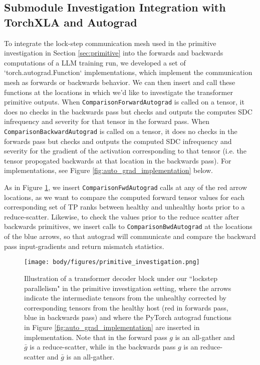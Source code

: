 \subsection{Submodule Investigation Integration with TorchXLA and Autograd}

To integrate the lock-step communication mesh used in the primitive investigation in Section \ref{sec:primitive} into the forwards and backwards computations of a LLM training run, we developed a set of `torch.autograd.Function` implementations, which implement the communication mesh as forwards or backwards behavior. We can then insert and call these functions at the locations in which we'd like to investigate the transformer primitive outputs. When \verb|ComparisonForwardAutograd| is called on a tensor, it does no checks in the backwards pass but checks and outputs the computes SDC infrequency and severity for that tensor in the forward pass. When \verb|ComparisonBackwardAutograd| is called on a tensor, it does no checks in the forwards pass but checks and outputs the computed SDC infrequency and severity for the gradient of the activation corresponding to that tensor (i.e. the tensor propogated backwards at that location in the backwards pass). For implementations, see Figure \ref{fig:auto_grad_implementation} below.

As in Figure \ref{fig:primitive_investigation_appendix}, we insert \verb|ComparisonFwdAutograd| calls at any of the red arrow locations, as we want to compare the computed forward tensor values for each corresponding set of TP ranks between healthy and unhealthy hosts prior to a reduce-scatter. Likewise, to check the values prior to the reduce scatter after backwards primitives, we insert calls to \verb|ComparisonBwdAutograd| at the locations of the blue arrows, so that autograd will communicate and compare the backward pass input-gradients and return mismatch statistics.

\begin{figure}[t]
    \centering
    \texttt{[image: body/figures/primitive\_investigation.png]}
    \vskip -0.05in
    \caption{Illustration of a transformer decoder block under our ``lockstep parallelism" in the primitive investigation setting, where the arrows indicate the intermediate tensors from the unhealthy corrected by corresponding tensors from the healthy host (red in forwards pass, blue in backwards pass) and where the PyTorch autograd functions in Figure \ref{fig:auto_grad_implementation} are inserted in implementation. Note that in the forward pass $g$ is an all-gather and $\bar{g}$ is a reduce-scatter, while in the backwards pass $g$ is an reduce-scatter and $\bar{g}$ is an all-gather.}
    \vskip -0.15in
    \label{fig:primitive_investigation_appendix}
\end{figure}

